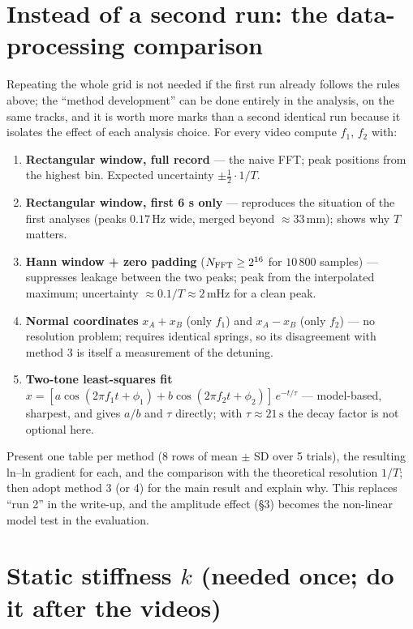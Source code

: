 \documentclass[11pt,a4paper]{article}
\newcommand{\un}[1]{\,\mathrm{#1}}
\begin{document}
\section{Instead of a second run: the data-processing comparison}

Repeating the whole grid is not needed if the first run already follows the rules above; the ``method development'' can be done entirely in the analysis, on the same tracks, and it is worth more marks than a second identical run because it isolates the effect of each analysis choice. For every video compute $f_1$, $f_2$ with:
\begin{enumerate}[leftmargin=1.6em,itemsep=1pt]
\item \textbf{Rectangular window, full record} --- the naive FFT; peak positions from the highest bin. Expected uncertainty $\pm\tfrac12\cdot1/T$.
\item \textbf{Rectangular window, first 6 s only} --- reproduces the situation of the first analyses (peaks $0.17\un{Hz}$ wide, merged beyond $\approx33\un{mm}$); shows why $T$ matters.
\item \textbf{Hann window + zero padding} ($N_{\rm FFT}\ge2^{16}$ for $10\,800$ samples) --- suppresses leakage between the two peaks; peak from the interpolated maximum; uncertainty $\approx0.1/T\approx2\un{mHz}$ for a clean peak.
\item \textbf{Normal coordinates} $x_A+x_B$ (only $f_1$) and $x_A-x_B$ (only $f_2$) --- no resolution problem; requires identical springs, so its disagreement with method 3 is itself a measurement of the detuning.
\item \textbf{Two-tone least-squares fit} $x=[a\cos(2\pi f_1t+\phi_1)+b\cos(2\pi f_2t+\phi_2)]\,e^{-t/\tau}$ --- model-based, sharpest, and gives $a/b$ and $\tau$ directly; with $\tau\approx21\un{s}$ the decay factor is not optional here.
\end{enumerate}
Present one table per method (8 rows of mean $\pm$ SD over 5 trials), the resulting ln--ln gradient for each, and the comparison with the theoretical resolution $1/T$; then adopt method 3 (or 4) for the main result and explain why. This replaces ``run 2'' in the write-up, and the amplitude effect (\S3) becomes the non-linear model test in the evaluation.

\section{Static stiffness $k$ (needed once; do it after the videos)}
\end{document}
